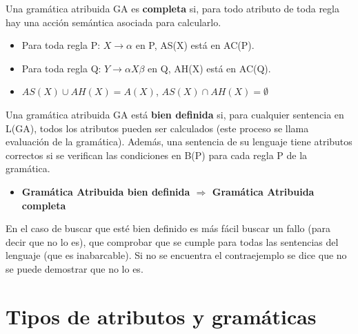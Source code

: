 \documentclass[12pt, twoside, openright]{report} %
\begin{document}
Una gramática atribuida GA es \textbf{completa} si, para todo atributo de toda regla hay una acción semántica asociada para calcularlo.
\begin{itemize}
  \item Para toda regla P: $X\rightarrow\alpha$ en P, AS(X) está en AC(P).
  \item Para toda regla Q: $Y\rightarrow\alpha X \beta$ en Q, AH(X) está en AC(Q).
  \item $AS(X) \cup AH(X) = A(X)$, $AS(X) \cap AH(X)=\emptyset$
\end{itemize}

Una gramática atribuida GA está \textbf{bien definida} si, para cualquier sentencia en L(GA), todos los atributos pueden ser calculados (este proceso se llama evaluación de la gramática). Además, una sentencia de su lenguaje tiene atributos correctos si se verifican las condiciones en B(P) para cada regla P de la gramática.
\begin{itemize}
  \item \textbf{Gramática Atribuida bien definida $\Rightarrow$ Gramática Atribuida completa}
\end{itemize}
En el caso de buscar que esté bien definido es más fácil buscar un fallo (para decir que no lo es), que comprobar que se cumple para todas las sentencias del lenguaje (que es inabarcable). Si no se encuentra el contraejemplo se dice que no se puede demostrar que no lo es.

\section{Tipos de atributos y gramáticas}
\end{document}
